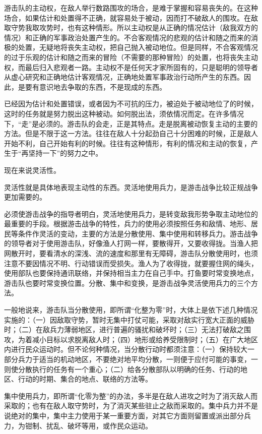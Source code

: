游击队的主动权，在敌人举行数路围攻的场合，是难于掌握和容易丧失的。在这种场合，如果估计和处置得不正确，就容易处于被动，因而打不破敌人的围攻。在敌取守势我取攻势时，也有这种情形。所以主动权是从正确的情况估计（敌我双方的情况）和正确的军事政治处置产生的。不合客观情况的悲观的估计和随之而来的消极的处置，无疑地将丧失主动权，把自己抛入被动地位。但是同样，不合客观情况的过于乐观的估计和随之而来的冒险（不需要的那种冒险）的处置，也将丧失主动权，而最后归入悲观者一路。主动权不是任何天才家所固有的，只是聪明的领导者从虚心研究和正确地估计客观情况，正确地处置军事政治行动所产生的东西。因此，是要有意识地去争取的东西，不是现成的东西。

已经因为估计和处置错误，或者因为不可抗的压力，被迫处于被动地位了的时候，这时的任务就是努力脱出这种被动。如何脱出法，须依情况而定。在许多情况下，“走”是必须的。游击队的会走，正是其特点。走是脱离被动恢复主动的主要的方法。但是不限于这一方法。往往在敌人十分起劲自己十分困难的时候，正是敌人开始不利，自己开始有利的时候。往往有这种情形，有利的情况和主动的恢复，产生于“再坚持一下”的努力之中。

现在来说灵活性。

灵活性就是具体地表现主动性的东西。灵活地使用兵力，是游击战争比较正规战争更加需要的。

必须使游击战争的指导者明白，灵活地使用兵力，是转变敌我形势争取主动地位的最重要的手段。根据游击战争的特性，兵力的使用必须按照任务和敌情、地形、居民等条件作灵活的变动，主要的方法是分散使用、集中使用和转移兵力。游击战争的领导者对于使用游击队，好像渔人打网一样，要散得开，又要收得拢。当渔人把网散开时，要看清水的深浅、流的速度和那里有无障碍，游击队分散使用时，也须注意不要因情况不明、行动错误而受损失。渔人为了收得拢，就要握住网的绳头，使用部队也要保持通讯联络，并保持相当主力在自己手中。打鱼要时常变换地点，游击队也要时常变换位置。分散、集中和变换，是游击战争灵活使用兵力的三个方法。

一般地说来，游击队当分散使用，即所谓“化整为零”时，大体上是依下述几种情况实施的：（一）因敌取守势，暂时无集中打仗可能，采取对敌实行宽大正面的威胁时；（二）在敌兵力薄弱地区，进行普遍的骚扰和破坏时；（三）无法打破敌之围攻，为着减小目标以求脱离敌人时；（四）地形或给养受限制时；（五）在广大地区内进行民众运动时。但不论何种情况，当分散行动时都须注意：（一）保持较大一部分兵力于适当的机动地区，不要绝对地平均分散，一则便于应付可能的事变，一则使分散执行的任务有一个重心；（二）给各分散部队以明确的任务、行动的地区、行动的时期、集合的地点、联络的方法等。

集中使用兵力，即所谓“化零为整”的办法，多半是在敌人进攻之时为了消灭敌人而采取的；也有在敌人取守势时，为了消灭某些驻止之敌而采取的。集中兵力并不是说绝对的集中，集中主力使用于某一重要方面，对其它方面则留置或派出部分兵力，为钳制、扰乱、破坏等用，或作民众运动。

